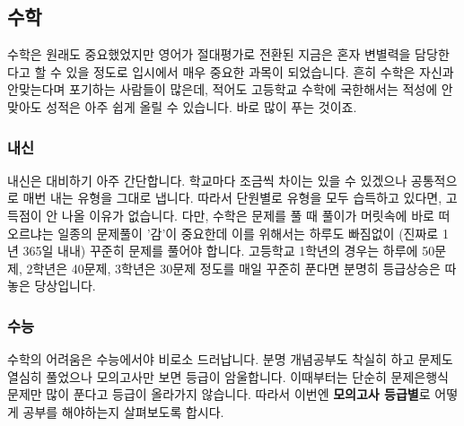 \documentclass[final]{IEEEphot}
\begin{document}
\vspace{0.2cm}


\subsection{수학}

\hspace{0.3cm} 수학은 원래도 중요했었지만 영어가 절대평가로 전환된 지금은 혼자 변별력을 담당한다고 할 수 있을 정도로 입시에서 매우 중요한 과목이 되었습니다.
흔히 수학은 자신과 안맞는다며 포기하는 사람들이 많은데, 적어도 고등학교 수학에 국한해서는 적성에 안맞아도 성적은 아주 쉽게 올릴 수 있습니다. 바로 많이 푸는 것이죠.

\subsubsection{내신}

\hspace{0.3cm} 내신은 대비하기 아주 간단합니다. 학교마다 조금씩 차이는 있을 수 있겠으나 공통적으로 매번 내는 유형을 그대로 냅니다. 따라서 단원별로 유형을 모두 습득하고 있다면,
고득점이 안 나올 이유가 없습니다. 다만, 수학은 문제를 풀 때 풀이가 머릿속에 바로 떠오르냐는 일종의 문제풀이 '감'이 중요한데 이를 위해서는 하루도 빠짐없이 (진짜로 1년 365일 내내) 꾸준히 문제를 풀어야 합니다. 
고등학교 1학년의 경우는 하루에 50문제, 2학년은 40문제, 3학년은 30문제 정도를 매일 꾸준히 푼다면 분명히 등급상승은 따놓은 당상입니다.

\pagebreak

\subsubsection{수능}

\hspace{0.3cm} 수학의 어려움은 수능에서야 비로소 드러납니다. 분명 개념공부도 착실히 하고 문제도 열심히 풀었으나 모의고사만 보면 등급이 암울합니다. 이때부터는 단순히 문제은행식 문제만 많이
푼다고 등급이 올라가지 않습니다. 따라서 이번엔 \textbf{모의고사 등급별}로 어떻게 공부를 해야하는지 살펴보도록 합시다.
\end{document}
